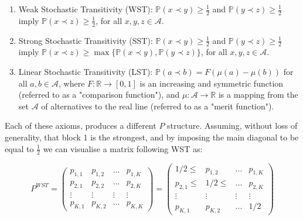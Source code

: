\documentclass[11pt]{amsart}
\begin{document}
\begin{enumerate}
\item Weak Stochastic Transitivity (WST): $\mathbb{P}(x \prec y) \geq \frac{1}{2}$ and $\mathbb{P}(y \prec z) \geq \frac{1}{2}$ imply $\mathbb{P}(x \prec z) \geq \frac{1}{2}$, for all $x, y, z \in \mathcal{A}$.

\item Strong Stochastic Transitivity (SST): $\mathbb{P}(x \prec y) \geq \frac{1}{2}$ and $\mathbb{P}(y \prec z) \geq \frac{1}{2}$ imply $\mathbb{P}(x \prec z) \geq \max \{\mathbb{P}(x \prec y), \mathbb{P}(y \prec z)\}$, for all $x, y, z \in \mathcal{A}$.

\item Linear Stochastic Transitivity (LST): $\mathbb{P}(a \prec b) = F(\mu(a) - \mu(b))$ for all $a, b \in \mathcal{A}$, where $F:\mathbb{R} \to [0, 1]$ is an increasing and symmetric function (referred to as a "comparison function"), and $\mu: \mathcal{A} \to \mathbb{R}$ is a mapping from the set $\mathcal{A}$ of alternatives to the real line (referred to as a "merit function").
\end{enumerate}

Each of these axioms, produces a different $P$ structure. Assuming, without loss of generality, that block 1 is the strongest, and by imposing the main diagonal to be equal to $\frac{1}{2}$ we can visualise a matrix following WST as:

\begin{center}
\begin{equation}
\label{eq:WST_P}
P^{WST} = 
\left(\begin{array}{cccc}p_{1,1} & p_{1,2} &  ... & p_{1,K} \\ p_{2,1} & p_{2,2} & ... & p_{2,K} \\ \vdots & \vdots & \vdots & \vdots \\ p_{K,1}& p_{K,2 }& ... & p_{K,K}\end{array}\right) =  
\left(\begin{array}{cccc} 1/2 \leq & p_{1,2} & ... & p_{1,K} \\  p_{2,1} \leq &  1/2 \leq & ... &  p_{2,K}  \\ \vdots & \vdots & \vdots & \vdots \\  p_{K,1}& p_{K,2 }&  ... &  1/2 \end{array}\right) 
\end{equation}
\end{center}
 
\end{document}
